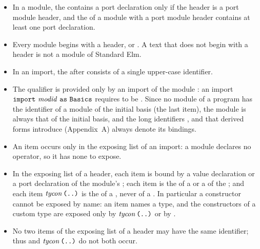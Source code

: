 \begin{itemize}
\item{} In a module, the \topdec{} contains a port declaration only if the
  header is a port module header, and the \topdec{} of a module with a port
  module header contains at least one port declaration.

\item{} Every module begins with a header,  \modid{}
   \explist{} or  \modid{} 
  \explist{}. A text that does not begin with a header is not a module of
  Standard Elm.

\item{} In an import, the \modid{} after  consists of a single
  upper-case identifier.

\item{} The qualifier  is provided only by an import of the module
  : an import $\kw{import}\ \modid\ \kw{as}\ \kw{Basics}$
  requires \modid{} to be . Since no module of a program has the
  identifier of a module of the initial basis (the last item), the module
   is always that of the initial basis, and the long identifiers
  ,  and  that derived
  forms introduce (Appendix~A) always denote its bindings.

\item{} An item \kw{(}\opv\kw{)} occurs only in the exposing list of an import:
  a module declares no operator, so it has none to expose.

\item{} In the exposing list of a header, each item \var{} is bound by a value
  declaration or a port declaration of the module's \topdec; each item
  \tycon{} is the \tycon{} of a \datbind{} or a \typbind{} of the \topdec; and
  each item $\mathit{tycon}\,\textnormal{\texttt{(..)}}$ is the \tycon{} of a \datbind, never of a
  \typbind. In particular a constructor cannot be exposed by name: an item
  \tycon{} names a type, and the constructors of a custom type are exposed
  only by $\mathit{tycon}\,\textnormal{\texttt{(..)}}$ or by .

\item{} No two items of the exposing list of a header may have the same
  identifier; thus \tycon{} and $\mathit{tycon}\,\textnormal{\texttt{(..)}}$ do not both occur.


\end{itemize}
